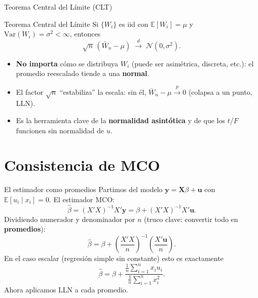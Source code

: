 \documentclass{beamer}
\begin{document}
\begin{frame}{Teorema Central del Límite (CLT)}
    \begin{alertblock}{Teorema Central del Límite}
    Si $\{W_i\}$ es iid con $\mathbb{E}[W_i]=\mu$ y $\text{Var}(W_i)=\sigma^2<\infty$, entonces
    \[
    \sqrt{n}\,(\bar{W}_n - \mu) \;\overset{d}{\to}\; \mathcal{N}(0,\sigma^2).
    \]
    \end{alertblock}
    \pause
    \begin{itemize}
        \item \textbf{No importa} cómo se distribuya $W_i$ (puede ser asimétrica, discreta, etc.): el promedio reescalado tiende a una \textbf{normal}.
        \item El factor $\sqrt{n}$ ``estabiliza'' la escala: sin él, $\bar{W}_n-\mu \overset{p}{\to} 0$ (colapsa a un punto, LLN).
        \item Es la herramienta clave de la \textbf{normalidad asintótica} y de que los $t$/$F$ funcionen sin normalidad de $u$.
    \end{itemize}
\end{frame}

\section{Consistencia de MCO}

\begin{frame}{El estimador como promedios}
    Partimos del modelo $\mathbf{y}=\mathbf{X}\beta+\mathbf{u}$ con $\mathbb{E}[u_i\mid x_i]=0$. El estimador MCO:
    \[
    \hat{\beta} = (X'X)^{-1}X'\mathbf{y} = \beta + (X'X)^{-1}X'\mathbf{u}.
    \]
    \pause
    Dividiendo numerador y denominador por $n$ (truco clave: convertir todo en \textbf{promedios}):
    \[
    \hat{\beta} = \beta + \left(\frac{X'X}{n}\right)^{-1}\left(\frac{X'\mathbf{u}}{n}\right).
    \]
    \pause
    En el caso escalar (regresión simple sin constante) esto es exactamente
    \[
    \hat{\beta} = \beta + \frac{\frac{1}{n}\sum_{i=1}^n x_i u_i}{\frac{1}{n}\sum_{i=1}^n x_i^2}.
    \]
    Ahora aplicamos LLN a cada promedio.
\end{frame}
\end{document}
